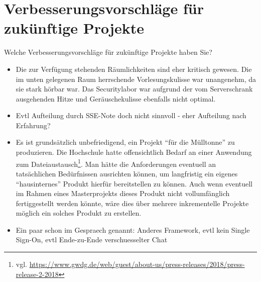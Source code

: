 \documentclass[12pt,DIV14,BCOR10mm,a4paper,parskip=half-,headsepline,headinclude,english,ngerman,bibliography=totocnumbered]{scrreprt}
\begin{document}
\chapter{Verbesserungsvorschläge für zukünftige Projekte}

Welche Verbesserungsvorschläge für zukünftige Projekte haben Sie?

\begin{itemize}
  \item Die zur Verfügung stehenden Räumlichkeiten sind eher kritisch gewesen. Die im unten gelegenen Raum herrschende Vorlesungskulisse war unangenehm, da sie stark hörbar war. Das Securitylabor war aufgrund der vom Serverschrank ausgehenden Hitze und Geräuschekulisse ebenfalls nicht optimal.
  \item Evtl Aufteilung durch SSE-Note doch nicht sinnvoll - eher Aufteilung nach Erfahrung?
  \item Es ist grundsätzlich unbefriedigend, ein Projekt \enquote{für die Mülltonne} zu produzieren. Die Hochschule hatte offensichtlich Bedarf an einer Anwendung zum Dateiaustausch\footnote{vgl. \url{https://www.gwdg.de/web/guest/about-us/press-releases/2018/press-release-2-2018}}. Man hätte die Anforderungen eventuell an tatsächlichen Bedürfnissen ausrichten können, um langfristig ein eigenes \enquote{hausinternes} Produkt hierfür bereitstellen zu können. Auch wenn eventuell im Rahmen eines Masterprojekts dieses Produkt nicht vollumfänglich fertiggestellt werden könnte, wäre dies über mehrere inkrementelle Projekte möglich ein solches Produkt zu erstellen.
  \item Ein paar schon im Gespraech genannt: Anderes Framework, evtl kein Single Sign-On, evtl Ende-zu-Ende verschuesselter Chat
\end{itemize}

\printbibliography

\printacronyms[title=Abkürzungsverzeichnis,toctitle=Abkürzungsverzeichnis]
\printglossary[title=Glossar,toctitle=Glossar,type=main]

\iftotalfigures
  \listoffigures
\fi


\begin{appendices}

\end{appendices}
\end{document}
